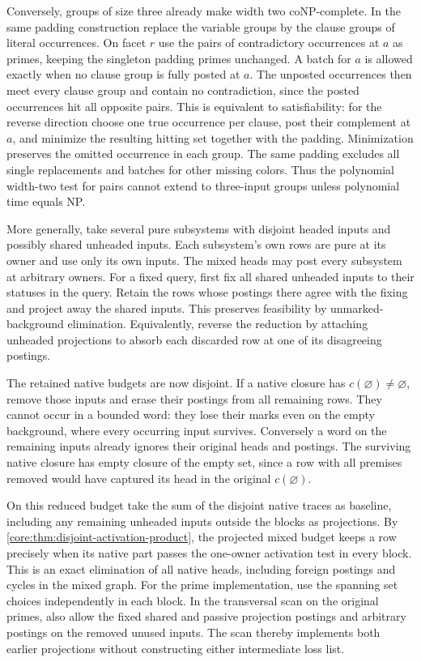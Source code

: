 Conversely, groups of size three already make
width two coNP-complete. In the same padding
construction replace the variable groups by the
clause groups of literal occurrences. On facet $r$
use the pairs of contradictory occurrences at
$a$ as primes, keeping the singleton padding
primes unchanged. A batch for $a$ is allowed
exactly when no clause group is fully posted at
$a$. The unposted occurrences then meet every
clause group and contain no contradiction, since
the posted occurrences hit all opposite pairs.
This is equivalent to satisfiability: for the
reverse direction choose one true occurrence per
clause, post their complement at $a$, and minimize
the resulting hitting set together with the padding.
Minimization preserves the omitted occurrence
in each group. The same padding excludes all
single replacements and batches for other missing
colors. Thus the polynomial width-two test for
pairs cannot extend to three-input groups unless
polynomial time equals NP.

More generally, take several pure subsystems with
disjoint headed inputs and possibly shared unheaded
inputs. Each subsystem's own rows are pure at its owner
and use only its own inputs. The mixed heads may post
every subsystem at arbitrary owners. For a fixed query,
first fix all shared unheaded inputs to their statuses
in the query. Retain the rows whose postings there agree
with the fixing and project away the shared inputs.
This preserves feasibility by unmarked-background
elimination. Equivalently, reverse the reduction by
attaching unheaded projections to absorb each discarded
row at one of its disagreeing postings.

The retained native budgets are now disjoint. If a
native closure has $c(\varnothing)\ne\varnothing$, remove
those inputs and erase their postings from all remaining
rows. They cannot occur in a bounded word: they lose
their marks even on the empty background, where every
occurring input survives. Conversely a word on the
remaining inputs already ignores their original heads
and postings. The surviving native closure has empty
closure of the empty set, since a row with all premises
removed would have captured its head in the original
$c(\varnothing)$.

On this reduced budget take the sum of the disjoint
native traces as baseline, including any remaining
unheaded inputs outside the blocks as projections. By
\cref{core:thm:disjoint-activation-product}, the projected
mixed budget keeps a row precisely when its native part
passes the one-owner activation test in every block.
This is an exact elimination of all native heads,
including foreign postings and cycles in the mixed
graph. For the prime implementation, use the spanning
set choices independently in each block. In the
transversal scan on the original primes, also allow
the fixed shared and passive projection postings and arbitrary postings on
the removed unused inputs. The scan thereby implements
both earlier projections without constructing either
intermediate loss list.

